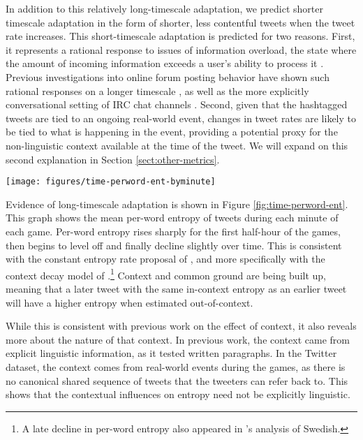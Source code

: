 \documentclass[11pt,letterpaper]{article}
\begin{document}
In addition to this relatively long-timescale adaptation, we predict shorter timescale adaptation in the form of shorter, less contentful tweets when the tweet rate increases. This short-timescale adaptation is predicted for two reasons. First, it represents a rational response to issues of information overload, the state where the amount of incoming information exceeds a user's ability to process it \cite{miller1956}.  Previous investigations into online forum posting behavior have shown such rational responses on a longer timescale \cite{jones2001a,jones2001b,whittaker2003,schoberth2003}, as well as the more explicitly conversational setting of IRC chat channels \cite{jones2008}.  Second, given that the hashtagged tweets are tied to an ongoing real-world event, changes in tweet rates are likely to be tied to what is happening in the event, providing a potential proxy for the non-linguistic context available at the time of the tweet. We will expand on this second explanation in Section \ref{sect:other-metrics}.

\begin{figure*}
 \centering
  \texttt{[image: figures/time-perword-ent-byminute]}
 \caption{Per-word entropy increases with time for the first two hours of the games, then levels off and slightly declines. Loess curve fitting with 95\% confidence intervals.}\label{fig:time-perword-ent}\vspace*{-.5em}
\end{figure*}

Evidence of long-timescale adaptation is shown in Figure \ref{fig:time-perword-ent}. This graph shows the mean per-word entropy of tweets during each minute of each game.  Per-word entropy rises sharply for the first half-hour of the games, then begins to level off and finally decline slightly over time.  This is consistent with the constant entropy rate proposal of \cite{genzel2002}, and more specifically with the context decay model of \cite{qian2012}.\footnote{A late decline in per-word entropy also appeared in \cite{qian2012}'s analysis of Swedish.}  Context and common ground are being built up, meaning that a later tweet with the same in-context entropy as an earlier tweet will have a higher entropy when estimated out-of-context.

While this is consistent with previous work on the effect of context, it also reveals more about the nature of that context.  In previous work, the context came from explicit linguistic information, as it tested written paragraphs.  In the Twitter dataset, the context comes from real-world events during the games, as there is no canonical shared sequence of tweets that the tweeters can refer back to.  This shows that the contextual influences on entropy need not be explicitly linguistic.
\end{document}
